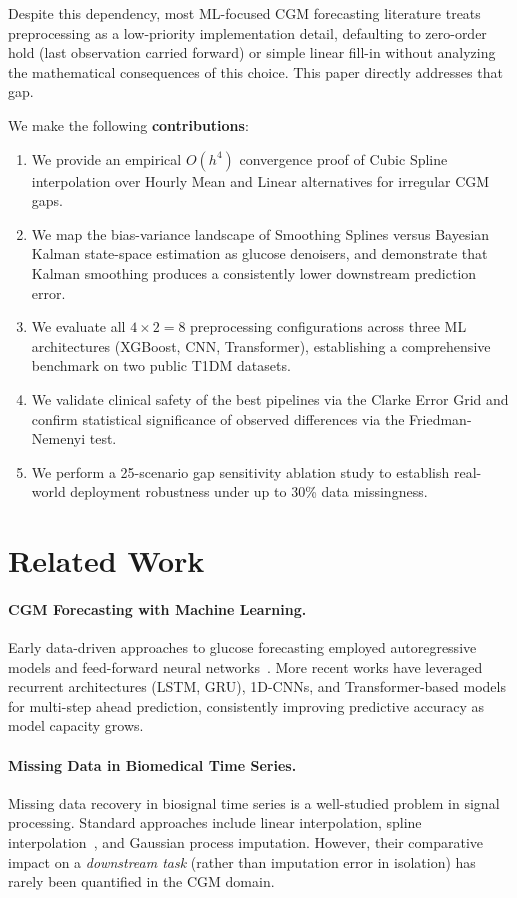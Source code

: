 \documentclass[pmlr,twocolumn,10pt]{jmlr} %
\begin{document}
Despite this dependency, most ML-focused CGM forecasting literature treats preprocessing as a low-priority implementation detail, defaulting to zero-order hold (last observation carried forward) or simple linear fill-in without analyzing the mathematical consequences of this choice. This paper directly addresses that gap.

We make the following \textbf{contributions}:
\begin{enumerate}[label=\textbf{\arabic*.}, leftmargin=*, nosep]
    \item We provide an empirical $O(h^4)$ convergence proof of Cubic Spline interpolation over Hourly Mean and Linear alternatives for irregular CGM gaps.
    \item We map the bias-variance landscape of Smoothing Splines versus Bayesian Kalman state-space estimation as glucose denoisers, and demonstrate that Kalman smoothing produces a consistently lower downstream prediction error.
    \item We evaluate all $4 \times 2 = 8$ preprocessing configurations across three ML architectures (XGBoost, CNN, Transformer), establishing a comprehensive benchmark on two public T1DM datasets.
    \item We validate clinical safety of the best pipelines via the Clarke Error Grid and confirm statistical significance of observed differences via the Friedman-Nemenyi test.
    \item We perform a 25-scenario gap sensitivity ablation study to establish real-world deployment robustness under up to 30\% data missingness.
\end{enumerate}

\section{Related Work}

\paragraph{CGM Forecasting with Machine Learning.}
Early data-driven approaches to glucose forecasting employed autoregressive models and feed-forward neural networks~\citep{marling2020ohiot1dm}. More recent works have leveraged recurrent architectures (LSTM, GRU), 1D-CNNs, and Transformer-based models for multi-step ahead prediction, consistently improving predictive accuracy as model capacity grows.

\paragraph{Missing Data in Biomedical Time Series.}
Missing data recovery in biosignal time series is a well-studied problem in signal processing. Standard approaches include linear interpolation, spline interpolation~\citep{deboor1978practical}, and Gaussian process imputation. However, their comparative impact on a \emph{downstream task} (rather than imputation error in isolation) has rarely been quantified in the CGM domain.
\end{document}
